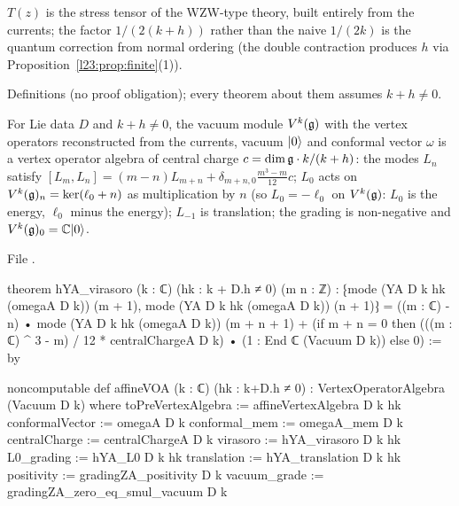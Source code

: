 \begin{physics}
$T(z)$ is the stress tensor of the WZW-type theory, built entirely from the currents; the factor $1/(2(k+h))$
rather than the naive $1/(2k)$ is the quantum correction from normal ordering (the double contraction produces
$h$ via Proposition~\ref{l23:prop:finite}(1)).
\end{physics}

\begin{status}
Definitions (no proof obligation); every theorem about them assumes $k+h\ne0$.
\end{status}

\begin{theorem}\label{l23:thm:affineVOA}
For Lie data $D$ and $k+h\ne0$, the vacuum module $V^k(\mathfrak g)$ with the vertex operators reconstructed from the currents,
vacuum $|0\rangle$ and conformal vector $\omega$ is a vertex operator algebra of central charge
$c=\dim\mathfrak g\cdot k/(k+h)$: the modes $L_n$ satisfy
$[L_m,L_n]=(m-n)L_{m+n}+\delta_{m+n,0}\frac{m^3-m}{12}c$; $L_0$ acts on $V^k(\mathfrak g)_n=\ker(\ell_0+n)$ as multiplication by $n$
(so $L_0=-\ell_0$ on $V^k(\mathfrak g)$: $L_0$ is the energy, $\ell_0$ minus the energy); $L_{-1}$ is translation; the
grading is non-negative and $V^k(\mathfrak g)_0={\mathbb{C}}|0\rangle$.
\end{theorem}
\noindent File .
\begin{leancode}
theorem hYA_virasoro (k : ℂ) (hk : k + D.h ≠ 0) (m n : ℤ) :
    ⁅mode (YA D k hk (omegaA D k)) (m + 1), mode (YA D k hk (omegaA D k)) (n + 1)⁆
      = ((m : ℂ) - n) • mode (YA D k hk (omegaA D k)) (m + n + 1)
        + (if m + n = 0 then
            (((m : ℂ) ^ 3 - m) / 12 * centralChargeA D k) • (1 : End ℂ (Vacuum D k))
           else 0) := by

noncomputable def affineVOA (k : ℂ) (hk : k+D.h ≠ 0) :
    VertexOperatorAlgebra (Vacuum D k) where
  toPreVertexAlgebra := affineVertexAlgebra D k hk
  conformalVector := omegaA D k
  conformal_mem := omegaA_mem D k
  centralCharge := centralChargeA D k
  virasoro := hYA_virasoro D k hk
  L0_grading := hYA_L0 D k hk
  translation := hYA_translation D k hk
  positivity := gradingZA_positivity D k
  vacuum_grade := gradingZA_zero_eq_smul_vacuum D k
\end{leancode}

